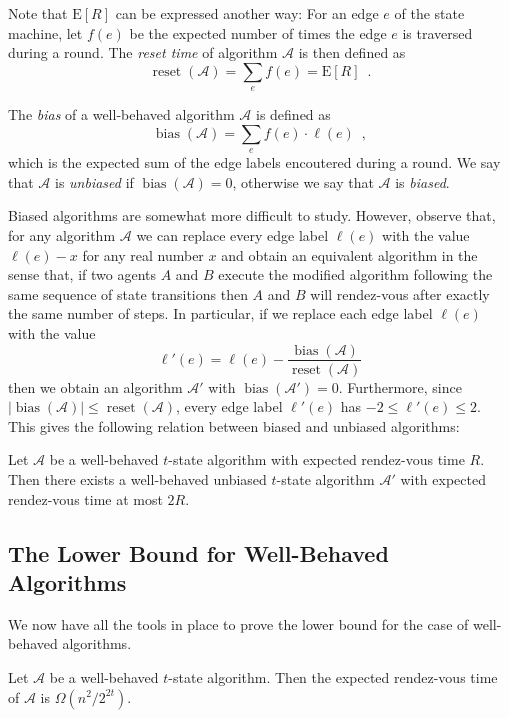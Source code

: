 \documentclass[lotsofwhite]{patmorin}
\newcommand{\E}{\mathrm{E}}
\newcommand{\A}{\mathcal{A}}
\DeclareMathOperator{\bias}{bias}
\DeclareMathOperator{\reset}{reset}
\begin{document}
Note that $\E[R]$ can be expressed another way: For an edge $e$ of the
state machine, let $f(e)$ be the expected number of times the edge $e$
is traversed during a round.  The
\emph{reset time} of algorithm $\A$ is then defined as
\[
   \reset(\A) = \sum_e f(e) = \E[R] \enspace .
\]

The \emph{bias} of a well-behaved algorithm $\A$ is defined as
\[
    \bias(\A) = \sum_{e} f(e)\cdot\ell(e) \enspace ,
\]
which is the expected sum of the edge labels encoutered during a round.
We say that $\A$ is \emph{unbiased} if $\bias(\A)=0$, otherwise we say
that $\A$ is \emph{biased}.

Biased algorithms are somewhat more difficult to study.  However,
observe that, for any algorithm $\mathcal{A}$ we can replace every
edge label $\ell(e)$ with the value $\ell(e)-x$ for any real number
$x$ and obtain an equivalent algorithm in the sense that, if two
agents $A$ and $B$ execute the modified algorithm following the same
sequence of state transitions then $A$ and $B$ will rendez-vous after
exactly the same number of steps.  In particular, if we replace each
edge label $\ell(e)$ with the value
\[
   \ell'(e) = \ell(e) - \frac{\bias(\A)}{\reset(\A)}
\]
then we obtain an algorithm $\A'$ with $\bias(\A')=0$.  Furthermore, since
$|\bias(\A)|\le\reset(\A)$, every edge label $\ell'(e)$ has
$-2 \le \ell'(e)\le 2$.  This gives the following relation between
biased and unbiased algorithms:

\begin{lem}
Let $\A$ be a well-behaved $t$-state algorithm with expected rendez-vous time
$R$.  Then there exists a well-behaved unbiased $t$-state algorithm $\A'$ with
expected rendez-vous time at most $2R$.
\end{lem}

\subsection{The Lower Bound for Well-Behaved Algorithms}

We now have all the tools in place to prove the lower bound for the
case of well-behaved algorithms.

\begin{lem}
Let $\A$ be a well-behaved $t$-state algorithm.  Then the expected rendez-vous
time of $\A$ is $\Omega(n^2/2^{2t})$.
\end{lem}
\end{document}
